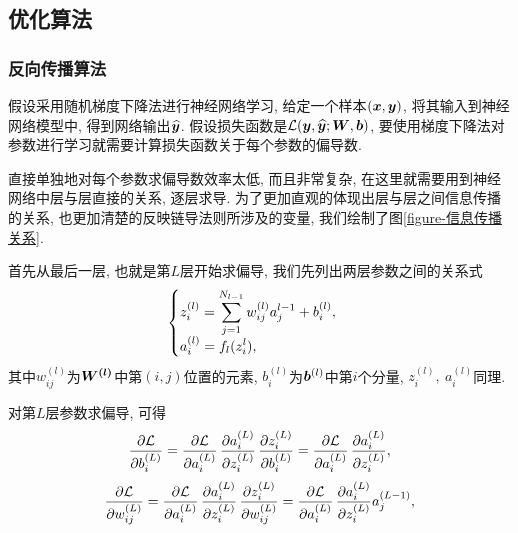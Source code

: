 \documentclass[12pt, a4paper, oneside]{ctexart}
\begin{document}
{\subsection{优化算法}
\subsubsection{反向传播算法}
假设采用随机梯度下降法进行神经网络学习, 给定一个样本$(\boldsymbol{x}, \boldsymbol{y})$, 将其输入到神经网络模型中, 得到网络输出$\widehat{\boldsymbol{y}}$. 假设损失函数是$\mathcal{L}(\boldsymbol{y}, \widehat{\boldsymbol{y}}; \boldsymbol{W}, \boldsymbol{b})$, 要使用梯度下降法对参数进行学习就需要计算损失函数关于每个参数的偏导数. 

直接单独地对每个参数求偏导数效率太低, 而且非常复杂, 在这里就需要用到神经网络中层与层直接的关系, 逐层求导. 为了更加直观的体现出层与层之间信息传播的关系, 也更加清楚的反映链导法则所涉及的变量, 我们绘制了图\ref{figure-信息传播关系}.

首先从最后一层, 也就是第$L$层开始求偏导, 我们先列出两层参数之间的关系式
\begin{equation}
    \begin{cases}
        \displaystyle z_i^{(l)} = \sum_{j=1}^{N_{l-1}}w_{ij}^{(l)}a_j^{l-1}+b_i^{(l)},\\
        \displaystyle a_i^{(l)} = f_l(z_i^{l}),
    \end{cases}
\end{equation}
其中$w_{ij}^{(l)}$为$\boldsymbol{W^{(l)}}$中第$(i,j)$位置的元素, $b_i^{(l)}$为$\boldsymbol{b}^{(l)}$中第$i$个分量, $z_i^{(l)},\ a_i^{(l)}$同理.

对第$L$层参数求偏导, 可得
\begin{equation}\label{eq-calc_b}
    \frac{\partial \mathcal{L}}{\partial b_i^{(L)}} = \frac{\partial \mathcal{L}}{\partial a_i^{(L)}}\,\frac{\partial a_i^{(L)}}{\partial z_i^{(L)}}\,\frac{\partial z_i^{(L)}}{\partial b_i^{(L)}} = \frac{\partial \mathcal{L}}{\partial a_i^{(L)}}\,\frac{\partial a_i^{(L)}}{\partial z_i^{(L)}},
\end{equation}
\begin{equation}\label{eq-calc_w}
    \frac{\partial \mathcal{L}}{\partial w_{ij}^{(L)}} = \frac{\partial \mathcal{L}}{\partial a_i^{(L)}}\,\frac{\partial a_i^{(L)}}{\partial z_i^{(L)}}\,\frac{\partial z_i^{(L)}}{\partial w_{ij}^{(L)}} = \frac{\partial \mathcal{L}}{\partial a_i^{(L)}}\,\frac{\partial a_i^{(L)}}{\partial z_i^{(L)}}a_j^{(L-1)},
\end{equation}
}
\end{document}
